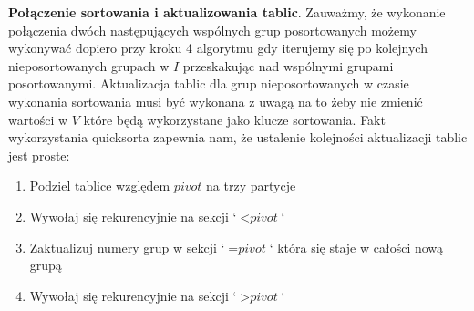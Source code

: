 \documentclass[12pt]{article}
\begin{document}
\textbf{Połączenie sortowania i aktualizowania tablic}. Zauważmy, że wykonanie połączenia dwóch następujących wspólnych grup posortowanych możemy wykonywać dopiero przy kroku 4 algorytmu gdy iterujemy się po kolejnych nieposortowanych grupach w $I$ przeskakując nad wspólnymi grupami posortowanymi. Aktualizacja tablic dla grup nieposortowanych w czasie wykonania sortowania musi być wykonana z uwagą na to żeby nie zmienić wartości w $V$ które będą wykorzystane jako klucze sortowania. Fakt wykorzystania quicksorta zapewnia nam, że ustalenie kolejności aktualizacji tablic jest proste:
\begin{enumerate}
    \item Podziel tablice względem $pivot$ na trzy partycje
    \item Wywołaj się rekurencyjnie na sekcji `$< \textit{pivot}$`
    \item Zaktualizuj numery grup w sekcji `$= \textit{pivot}$` która się staje w całości nową grupą
    \item Wywołaj się rekurencyjnie na sekcji `$> \textit{pivot}$`
\end{enumerate}
\medskip

\printbibliography[title={Bibliografia}]
\end{document}

